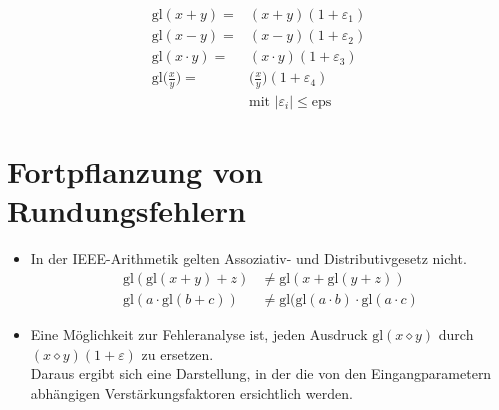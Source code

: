 \documentclass[a4paper, 11pt, accentcolor = tud3b]{tudreport}
\providecommand{\abs}[1]{\ensuremath{{\lvert #1 \rvert}}}
\newcommand{\eps}{\text{eps}}
\newcommand{\gl}{\text{gl}}
\begin{document}
\begin{itemize}
			        \begin{align*}
			        	\gl(x + y)                        = & (x + y)(1 + \varepsilon _ 1)                 \\
			        	\gl(x - y)                        = & (x - y)(1 + \varepsilon _ 2)                 \\
			        	\gl(x \cdot y)                    = & (x \cdot y)(1 + \varepsilon _ 3)             \\
			        	\gl\bigg(\frac{x}{y}\bigg)        = & \bigg(\frac{x}{y}\bigg)(1 + \varepsilon _ 4) \\
			        	                                    & \text{mit } \abs{\varepsilon _ i} \leq \eps
			        \end{align*}
            \end{itemize}

        \section{Fortpflanzung von Rundungsfehlern} %
            \begin{itemize}
            	\item In der IEEE-Arithmetik gelten Assoziativ- und Distributivgesetz nicht.
	            	\begin{align*}
	            		\gl(\gl(x + y) + z)     & \neq \gl(x + \gl(y + z))                     \\
	            		\gl(a \cdot \gl(b + c)) & \neq \gl(\gl(a \cdot b) \cdot \gl(a \cdot c)
	            	\end{align*}
				\item Eine Möglichkeit zur Fehleranalyse ist, jeden Ausdruck \( \gl(x \diamond y) \) durch \( (x \diamond y)(1 + \varepsilon) \) zu ersetzen. \\ Daraus ergibt sich eine Darstellung, in der die von den Eingangparametern abhängigen Verstärkungsfaktoren ersichtlich werden.
            \end{itemize}
\end{document}
